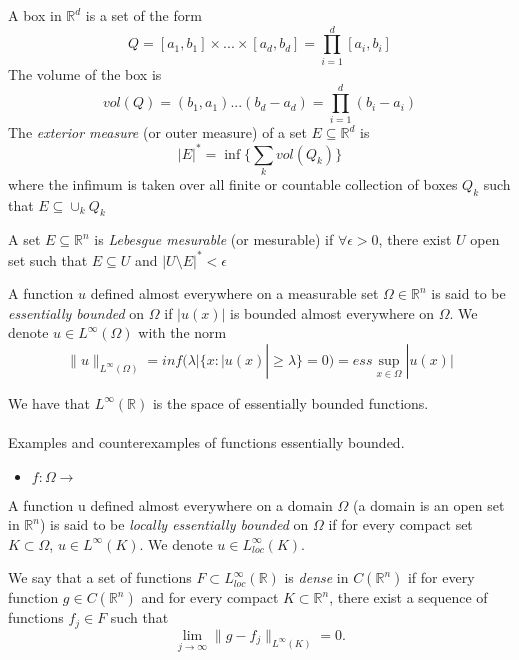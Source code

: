 \documentclass[../main.tex]{subfiles}
\begin{document}
\begin{definition} A box in $\mathbb{R}^d$ is a set of the form 
	$$ Q = [a_1,b_1]  \times ... \times [a_d,b_d] = \prod_{i=1}^d [a_i,b_i]$$
	The volume of the box is $$ vol(Q)= (b_1,a_1) ... (b_d-a_d)= \prod_{i=1}^d (b_i-a_i)$$
	The \emph{exterior measure} (or outer measure) of a set $E\subseteq \mathbb{R}^d$ is $$ |E|^* = \inf\{\sum_k vol(Q_k)\} $$ 
	where the infimum is taken over all finite or countable collection of boxes $Q_k$ such that $E \subseteq \cup_k Q_k$
\end{definition}

\begin{definition}
A set $E\subseteq \mathbb{R}^n $ is \emph{Lebesgue mesurable} (or mesurable) if $\forall \epsilon >0$, there exist $U$ open set such that $E \subseteq U$ and $|U\setminus E|^* < \epsilon $
\end{definition}

\begin{definition}
	A function $u$ defined almost everywhere on a measurable set $\Omega \in \mathbb{R}^n$ is said to be \emph{essentially bounded} on $\Omega$ if $|u(x)|$ is bounded almost everywhere on $\Omega$. We denote $u\in L^{\infty}(\Omega)$ with the norm $$\|u\|_{L^{\infty}(\Omega)}= inf(\lambda | \{ x : |u(x)| \geq \lambda \} = 0 ) = ess \sup_{x\in \Omega} |u(x)|$$

\end{definition}

\noindent We have that $L^{\infty}(\mathbb{R})$ is the space of essentially bounded functions.
\\ \\ 
Examples and counterexamples of functions essentially bounded. 
\begin{itemize}
\item $f:\Omega \rightarrow $
\end{itemize}

\begin{definition}
	A function u defined almost everywhere on a domain $\Omega$ (a domain is an open set in $\mathbb{R}^n$) is said to be\emph{ locally essentially bounded }on $\Omega$ if for every compact set $K\subset \Omega$, $u\in L^{\infty}(K)$. We denote $u\in L_{loc}^{\infty}(K)$.
\end{definition}

\begin{definition}We say that a set of functions $F\subset L_{loc}^{\infty}(\mathbb{R})$ is \emph{dense} in $C(\mathbb{R}^n)$ if for every function $g\in C(\mathbb{R}^n)$ and for every compact $K\subset \mathbb{R}^n$, there exist a sequence of functions $f_j\in F$ such that $$\lim_{j\rightarrow\infty} \|g-f_j\|_{L^\infty(K)}=0.$$ 
\end{definition}
\end{document}

